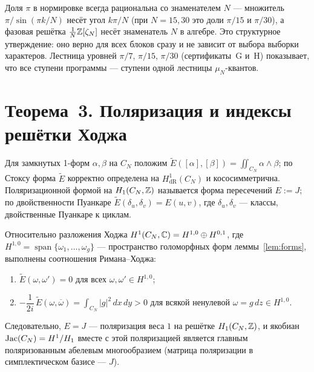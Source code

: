 \begin{remark}
Доля $\pi$ в нормировке всегда рациональна со знаменателем $N$ ---
множитель $\pi/\sin(\pi k/N)$ несёт угол $k\pi/N$ (при $N=15,30$ это
доли $\pi/15$ и $\pi/30$), а фазовая решётка $\frac1N\mathbb{Z}[\zeta_N]$
несёт знаменатель $N$ в алгебре. Это структурное утверждение: оно
верно для всех блоков сразу и не зависит от выбора выборки
характеров. Лестница уровней $\pi/7$, $\pi/15$, $\pi/30$
(сертификаты~G и~H) показывает, что все ступени программы --- ступени
одной лестницы $\mu_N$-квантов.
\end{remark}

\section{Теорема~3. Поляризация и индексы решётки Ходжа}\label{sec:indices}

\begin{definition}
\label{def:polarization}
Для замкнутых 1-форм $\alpha,\beta$ на $C_N$ положим
$\widetilde E([\alpha],[\beta])=\iint_{C_N}\alpha\wedge\beta$; по
Стоксу форма $\widetilde E$ корректно определена на
$H^1_{\mathrm{dR}}(C_N)$ и кососимметрична. Поляризационной формой на
$H_1(C_N,\mathbb{Z})$ называется форма пересечений $E:=J$; по двойственности
Пуанкаре $\widetilde E(\delta_u,\delta_v)=E(u,v)$, где
$\delta_u,\delta_v$ --- классы, двойственные Пуанкаре к циклам.
\end{definition}

\begin{theorem}
\label{th:polarization}
Относительно разложения Ходжа
$H^1(C_N,\mathbb{C})=H^{1,0}\oplus H^{0,1}$, где
$H^{1,0}=\operatorname{span}\{\omega_1,\dots,\omega_g\}$ ---
пространство голоморфных форм леммы~\ref{lem:forms}, выполнены
соотношения Римана--Ходжа:
\begin{enumerate}[leftmargin=2em, itemsep=0.15em]
\item $\widetilde E(\omega,\omega')=0$ для всех
  $\omega,\omega'\in H^{1,0}$;
\item $-\dfrac{1}{2i}\,\widetilde E(\omega,\overline{\omega})
  =\displaystyle\int_{C_N}|g|^2\,dx\,dy>0$ для всякой ненулевой
  $\omega=g\,dz\in H^{1,0}$.
\end{enumerate}
Следовательно, $E=J$ --- поляризация веса $1$ на решётке
$H_1(C_N,\mathbb{Z})$, и якобиан $\operatorname{Jac}(C_N)=H^1/H_1$ вместе с этой
поляризацией является главным поляризованным абелевым многообразием
(матрица поляризации в симплектическом базисе --- $J$).
\end{theorem}

